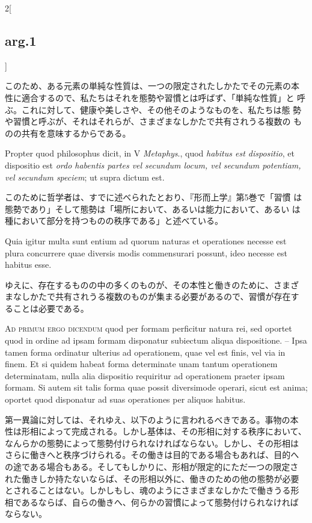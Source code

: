 \documentclass[paper=a4paper,fontsize=10pt,jafontsize=9pt,titlepage]{jlreq}
\begin{document}
\begin{paracol}{2}[\subsection{arg.1}]
\switchcolumn

このため、ある元素の単純な性質は、一つの限定されたしかたでその元素の本
性に適合するので、私たちはそれを態勢や習慣とは呼ばず、「単純な性質」と
呼ぶ。これに対して、健康や美しさや、その他そのようなものを、私たちは態
勢や習慣と呼ぶが、それはそれらが、さまざまなしかたで共有されうる複数の
ものの共有を意味するからである。

\switchcolumn*

Propter quod philosophus dicit, in V {\itshape Metaphys}.,
quod {\itshape habitus est dispositio}, et dispositio est {\itshape ordo habentis partes
vel secundum locum, vel secundum potentiam, vel secundum speciem}; ut
supra dictum est.

\switchcolumn

このために哲学者は、すでに述べられたとおり、『形而上学』第5巻で「習慣
は態勢であり」そして態勢は「場所において、あるいは能力において、あるい
は種において部分を持つものの秩序である」と述べている。

\switchcolumn*

Quia igitur multa sunt entium ad quorum naturas et
operationes necesse est plura concurrere quae diversis modis
commensurari possunt, ideo necesse est habitus esse.

\switchcolumn

ゆえに、存在するものの中の多くのものが、その本性と働きのために、さまざ
まなしかたで共有されうる複数のものが集まる必要があるので、習慣が存在す
ることは必要である。

\switchcolumn*[\subsection{ad.1}]

{\scshape Ad primum ergo dicendum} quod per formam perficitur natura rei, sed
oportet quod in ordine ad ipsam formam disponatur subiectum aliqua
dispositione. -- Ipsa tamen forma ordinatur ulterius ad operationem, quae
vel est finis, vel via in finem. Et si quidem habeat forma determinate
unam tantum operationem determinatam, nulla alia dispositio requiritur
ad operationem praeter ipsam formam. Si autem sit talis forma quae
possit diversimode operari, sicut est anima; oportet quod disponatur
ad suas operationes per aliquos habitus.

\switchcolumn

第一異論に対しては、それゆえ、以下のように言われるべきである。事物の本
性は形相によって完成される。しかし基体は、その形相に対する秩序において、
なんらかの態勢によって態勢付けられなければならない。しかし、その形相は
さらに働きへと秩序づけられる。その働きは目的である場合もあれば、目的へ
の途である場合もある。そしてもしかりに、形相が限定的にただ一つの限定さ
れた働きしか持たないならば、その形相以外に、働きのための他の態勢が必要
とされることはない。しかしもし、魂のようにさまざまなしかたで働きうる形
相であるならば、自らの働きへ、何らかの習慣によって態勢付けられなければ
ならない。


\end{paracol}
\end{document}
